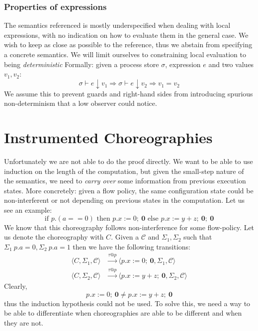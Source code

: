 \documentclass[12pt,a4paper,twoside]{book}
\begin{document}
\subsubsection{Properties of expressions}
The semantics referenced\cite{montesi2023introduction} is mostly underspecified when dealing with local expressions, with no indication on how to evaluate them in the general case.
We wish to keep as close as possible to the reference, thus we abstain from specifying a concrete semantics.
We will limit ourselves to constraining local evaluation to being \emph{deterministic}
Formally: given a process store $\sigma$, expression $e$ and two values $v_1, v_2$:
$$
\sigma \vdash e \downarrow v_1 \Rightarrow
\sigma \vdash e \downarrow v_2 \Rightarrow v_1 = v_2
$$
We assume this to prevent guards and right-hand sides from introducing spurious non-determinism that a low observer could notice.

\section{Instrumented Choreographies}
Unfortunately we are not able to do the proof directly. We want to be able to use induction on the length of the computation, but given the small-step nature of the semantics, we need to \emph{carry over} some information from previous execution states.
More concretely: given a flow policy, the same configuration state could be non-interferent or not depending on previous states in the computation. Let us see an example:
$$ \text{if } p.(a == 0) \text{ then } p.x := 0; ~ \boldsymbol{0} \text{ else } p.x := y + z; ~ \boldsymbol{0}; ~ \boldsymbol{0} $$
We know that this choreography follows non-interference for some flow-policy. Let us denote the choreography with $C$.
Given a $\mathscr{C}$ and $\Sigma_1, \Sigma_2$ such that $\Sigma_1~p.a = 0, \Sigma_2~p.a = 1$ then we have the following transitions:
\begin{align*}
	\langle C, \Sigma_1, \mathscr{C} \rangle &\xrightarrow{\tau @p}
	\langle p.x := 0;~ \boldsymbol{0}, \Sigma_1, \mathscr{C} \rangle \\
	\langle C, \Sigma_2, \mathscr{C} \rangle &\xrightarrow{\tau @p}
	\langle p.x := y + z;~ \boldsymbol{0}, \Sigma_2, \mathscr{C} \rangle
\end{align*}
Clearly, 
$$p.x := 0;~ \boldsymbol{0} \ne p.x := y + z;~ \boldsymbol{0}$$
thus the induction hypothesis could not be used. To solve this, we need a way to be able to differentiate when choreographies are able to be different and when they are not.
\end{document}
